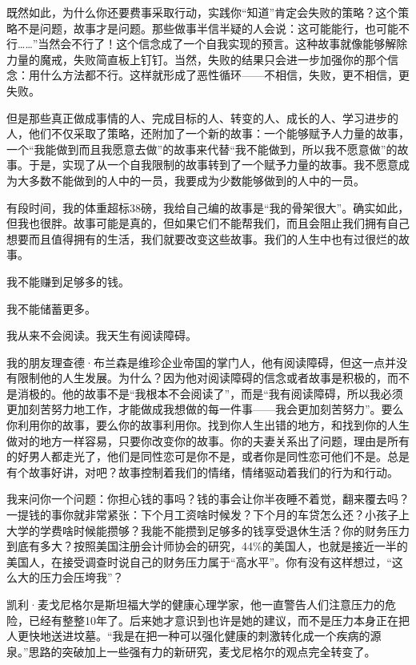 既然如此，为什么你还要费事采取行动，实践你“知道”肯定会失败的策略？这个策略不是问题，故事才是问题。那些做事半信半疑的人会说：这可能能行，也可能不行……”当然会不行了！这个信念成了一个自我实现的预言。这种故事就像能够解除力量的魔戒，失败简直板上钉钉。当然，失败的结果只会进一步加强你的那个信念：用什么方法都不行。这样就形成了恶性循环——不相信，失败，更不相信，更失败。

但是那些真正做成事情的人、完成目标的人、转变的人、成长的人、学习进步的人，他们不仅采取了策略，还附加了一个新的故事：一个能够赋予人力量的故事，一个“我能做到而且我愿意去做”的故事来代替“我不能做到，所以我不愿意做”的故事。于是，实现了从一个自我限制的故事转到了一个赋予力量的故事。我不愿意成为大多数不能做到的人中的一员，我要成为少数能够做到的人中的一员。

有段时间，我的体重超标38磅，我给自己编的故事是“我的骨架很大”。确实如此，但我也很胖。故事可能是真的，但如果它们不能帮我们，而且会阻止我们拥有自己想要而且值得拥有的生活，我们就要改变这些故事。我们的人生中也有过很烂的故事。

我不能赚到足够多的钱。

我不能储蓄更多。

我从来不会阅读。我天生有阅读障碍。

我的朋友理查德·布兰森是维珍企业帝国的掌门人，他有阅读障碍，但这一点并没有限制他的人生发展。为什么？因为他对阅读障碍的信念或者故事是积极的，而不是消极的。他的故事不是“我根本不会阅读了”，而是“我有阅读障碍，所以我必须更加刻苦努力地工作，才能做成我想做的每一件事——我会更加刻苦努力”。要么你利用你的故事，要么你的故事利用你。找到你人生出错的地方，和找到你的人生做对的地方一样容易，只要你改变你的故事。你的夫妻关系出了问题，理由是所有的好男人都走光了，他们是同性恋可是你不是，或者你是同性恋可他们不是。总是有个故事好讲，对吧？故事控制着我们的情绪，情绪驱动着我们的行为和行动。

我来问你一个问题：你担心钱的事吗？钱的事会让你半夜睡不着觉，翻来覆去吗？一提钱的事你就非常紧张：下个月工资啥时候发？下个月的车贷怎么还？小孩子上大学的学费啥时候能攒够？我能不能攒到足够多的钱享受退休生活？你的财务压力到底有多大？按照美国注册会计师协会的研究，44\%的美国人，也就是接近一半的美国人，在接受调查时说自己的财务压力属于“高水平”。你有没有这样想过，“这么大的压力会压垮我”？

凯利·麦戈尼格尔是斯坦福大学的健康心理学家，他一直警告人们注意压力的危险，已经有整整10年了。后来她才意识到也许是她的建议，而不是压力本身正在把人更快地送进坟墓。“我是在把一种可以强化健康的刺激转化成一个疾病的源泉。”思路的突破加上一些强有力的新研究，麦戈尼格尔的观点完全转变了。

